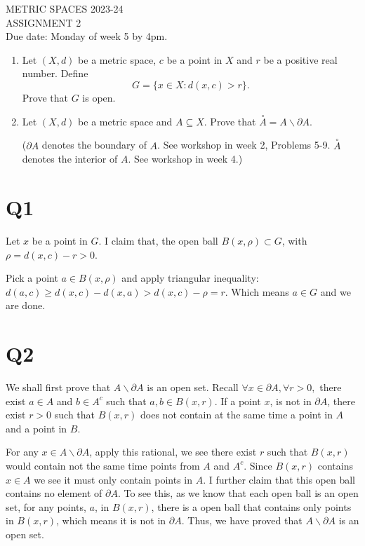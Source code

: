 \documentclass[12pt]{article}
\begin{document}
\begin{center}
	METRIC SPACES 2023-24\\
	ASSIGNMENT 2\\
	Due date: Monday of week 5 by 4pm.
\end{center}

\bigskip

\begin{enumerate}
	\item
	      Let $(X,d)$ be a metric space, $c$ be a point in $X$ and $r$ be a positive real number. Define
	      \[
		      G=\{x\in X : d(x,c)>r\}.
	      \]
	      Prove that $G$ is open.

	\item
	      Let $(X,d)$ be a metric space and $A\subseteq X$. Prove that $\overset{\circ}{A}=A \smallsetminus \partial A$.

	      ($\partial A$ denotes the boundary of $A$. See workshop in week 2, Problems 5-9. $\overset{\circ}{A}$ denotes the interior of $A$. See workshop in week 4.)
\end{enumerate}

\section{Q1}
Let $x$ be a point in $G$. I claim that, the open ball $B(x, \rho) \subset G$, with $\rho = d(x,c) - r > 0$.

Pick a point $a \in B(x, \rho)$ and apply triangular inequality: $d(a,c) \geq d(x,c) - d(x,a) > d(x,c) - \rho = r$. Which means $a \in G$ and we are done.

\newpage
\section{Q2}

We shall first prove that $A \smallsetminus \partial A$ is an open set.
Recall $\forall  x \in \partial A, \forall r > 0, $ there exist $a \in A $ and $b \in A^c$ such that $a, b \in B(x,r)$.
If a point $x$, is not in $\partial A$, there exist $r > 0$ such that $B(x, r)$ does not contain at the same time a point in $A$ and a point in $B$.

For any $x \in A \smallsetminus \partial A$,
apply this rational, we see there exist $r$ such that $B(x, r)$ would contain not the same time points from $A$ and $A^c$. Since $B(x, r)$ contains $x \in A$ we see it must only contain points in $A$. I further claim that this open ball contains no element of $\partial A$. To see this, as we know that each open ball is an open set, for any points, $a$, in $B(x,r)$, there is a open ball that contains only points in $B(x,r)$, which means it is not in $\partial A$. Thus, we have proved that $A \smallsetminus \partial A$ is an open set.
\end{document}
